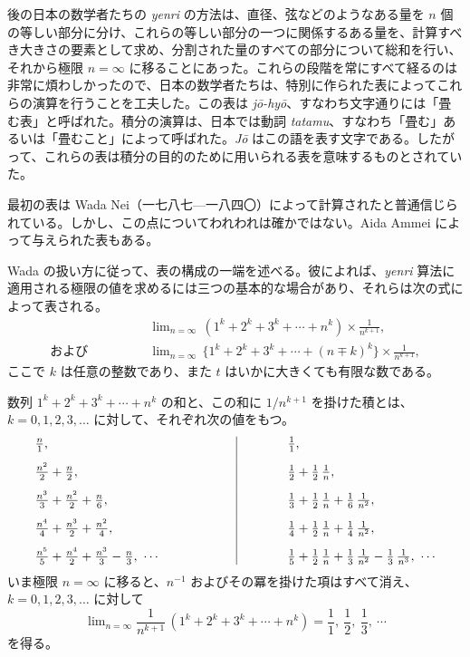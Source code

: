 \documentclass[11pt]{article}
\newcommand{\scanpage}[2]{\clearpage\setcounter{footnote}{0}\noindent{\footnotesize\color{gray}PDF #1 頁 · #2}\par\medskip}
\begin{document}
後の日本の数学者たちの \emph{yenri} の方法は、直径、弦などのようなある量を $n$ 個の等しい部分に分け、これらの等しい部分の一つに関係するある量を、計算すべき大きさの要素として求め、分割された量のすべての部分について総和を行い、それから極限 $n = \infty$ に移ることにあった。これらの段階を常にすべて経るのは非常に煩わしかったので、日本の数学者たちは、特別に作られた表によってこれらの演算を行うことを工夫した。この表は \emph{jō-hyō}、すなわち文字通りには「畳む表」と呼ばれた。積分の演算は、日本では動詞 \emph{tatamu}、すなわち「畳む」あるいは「畳むこと」によって呼ばれた。\emph{Jō} はこの語を表す文字である。したがって、これらの表は積分の目的のために用いられる表を意味するものとされていた。

\scanpage{0283}{印刷頁 269}
最初の表は Wada Nei（一七八七---一八四〇）によって計算されたと普通信じられている。しかし、この点についてわれわれは確かではない。Aida Ammei によって与えられた表もある。

Wada の扱い方に従って、表の構成の一端を述べる。彼によれば、\emph{yenri} 算法に適用される極限の値を求めるには三つの基本的な場合があり、それらは次の式によって表される。
\begin{align*}
&\lim\nolimits_{n=\infty}\,(1^k+2^k+3^k+\cdots+n^k)\times\frac{1}{n^{k+1}},\\
\text{および}\qquad\qquad&\lim\nolimits_{n=\infty}\,\{1^k+2^k+3^k+\cdots+(n\mp k)^k\}\times\frac{1}{n^{k+1}},
\end{align*}
ここで $k$ は任意の整数であり、また $t$ はいかに大きくても有限な数である。

数列 $1^k+2^k+3^k+\cdots+n^k$ の和と、この和に $1/n^{k+1}$ を掛けた積とは、$k=0, 1, 2, 3, \ldots$ に対して、それぞれ次の値をもつ。
\[
\begin{array}{l@{\hspace{6em}}|@{\hspace{4em}}l}
\frac{n}{1}, & \frac{1}{1},\\[3mm]
\frac{n^2}{2}+\frac{n}{2}, & \frac{1}{2}+\frac{1}{2}\,\frac{1}{n},\\[3mm]
\frac{n^3}{3}+\frac{n^2}{2}+\frac{n}{6}, & \frac{1}{3}+\frac{1}{2}\,\frac{1}{n}+\frac{1}{6}\,\frac{1}{n^2},\\[3mm]
\frac{n^4}{4}+\frac{n^3}{2}+\frac{n^2}{4}, & \frac{1}{4}+\frac{1}{2}\,\frac{1}{n}+\frac{1}{4}\,\frac{1}{n^2},\\[3mm]
\frac{n^5}{5}+\frac{n^4}{2}+\frac{n^3}{3}-\frac{n}{3},\ \cdots & \frac{1}{5}+\frac{1}{2}\,\frac{1}{n}+\frac{1}{3}\,\frac{1}{n^2}-\frac{1}{3}\,\frac{1}{n^3},\ \cdots
\end{array}
\]
いま極限 $n=\infty$ に移ると、$n^{-1}$ およびその冪を掛けた項はすべて消え、$k=0, 1, 2, 3, \ldots$ に対して
\[
\lim\nolimits_{n=\infty}\frac{1}{n^{k+1}}\,(1^k+2^k+3^k+\cdots+n^k)=\frac{1}{1},\ \frac{1}{2},\ \frac{1}{3},\ \cdots
\]
を得る。
\end{document}
